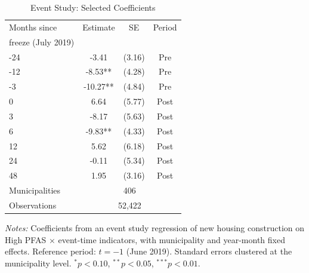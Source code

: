 \begin{table}[htbp]
\centering
\caption{Event Study: Selected Coefficients}
\label{tab:eventstudy}
\begin{threeparttable}
\begin{tabular}{lccc}
\hline\hline
Months since & Estimate & SE & Period \\
freeze (July 2019) & & & \\
\hline
-24 & -3.41 & (3.16) & Pre \\
-12 & -8.53** & (4.28) & Pre \\
-3 & -10.27** & (4.84) & Pre \\
0 & 6.64 & (5.77) & Post \\
3 & -8.17 & (5.63) & Post \\
6 & -9.83** & (4.33) & Post \\
12 & 5.62 & (6.18) & Post \\
24 & -0.11 & (5.34) & Post \\
48 & 1.95 & (3.16) & Post \\
\hline
Municipalities & \multicolumn{3}{c}{406} \\
Observations & \multicolumn{3}{c}{52,422} \\
\hline\hline
\end{tabular}
\begin{tablenotes}[flushleft]
\small
\item \textit{Notes:} Coefficients from an event study regression of new housing construction on High PFAS $\times$ event-time indicators, with municipality and year-month fixed effects. Reference period: $t = -1$ (June 2019). Standard errors clustered at the municipality level. $^{*}p < 0.10$, $^{**}p < 0.05$, $^{***}p < 0.01$.
\end{tablenotes}
\end{threeparttable}
\end{table}

